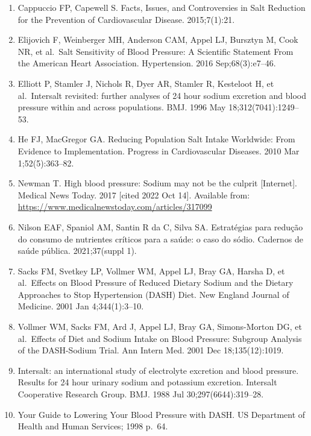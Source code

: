 \documentclass[
]{article}
\providecommand{\tightlist}{%
  \setlength{\itemsep}{0pt}\setlength{\parskip}{0pt}}
\begin{document}
\begin{enumerate}
\def\labelenumi{\arabic{enumi}.}
\tightlist
\item
  Cappuccio FP, Capewell S. Facts, Issues, and Controversies in Salt
  Reduction for the Prevention of Cardiovascular Disease. 2015;7(1):21.
\item
  Elijovich F, Weinberger MH, Anderson CAM, Appel LJ, Bursztyn M, Cook
  NR, et al.~Salt Sensitivity of Blood Pressure: A Scientific Statement
  From the American Heart Association. Hypertension. 2016
  Sep;68(3):e7--46.
\item
  Elliott P, Stamler J, Nichols R, Dyer AR, Stamler R, Kesteloot H, et
  al.~Intersalt revisited: further analyses of 24 hour sodium excretion
  and blood pressure within and across populations. BMJ. 1996 May
  18;312(7041):1249--53.
\item
  He FJ, MacGregor GA. Reducing Population Salt Intake Worldwide: From
  Evidence to Implementation. Progress in Cardiovascular Diseases. 2010
  Mar 1;52(5):363--82.
\item
  Newman T. High blood pressure: Sodium may not be the culprit
  {[}Internet{]}. Medical News Today. 2017 {[}cited 2022 Oct 14{]}.
  Available from: \url{https://www.medicalnewstoday.com/articles/317099}
\item
  Nilson EAF, Spaniol AM, Santin R da C, Silva SA. Estratégias para
  redução do consumo de nutrientes críticos para a saúde: o caso do
  sódio. Cadernos de saúde pública. 2021;37(suppl 1).
\item
  Sacks FM, Svetkey LP, Vollmer WM, Appel LJ, Bray GA, Harsha D, et
  al.~Effects on Blood Pressure of Reduced Dietary Sodium and the
  Dietary Approaches to Stop Hypertension (DASH) Diet. New England
  Journal of Medicine. 2001 Jan 4;344(1):3--10.
\item
  Vollmer WM, Sacks FM, Ard J, Appel LJ, Bray GA, Simons-Morton DG, et
  al.~Effects of Diet and Sodium Intake on Blood Pressure: Subgroup
  Analysis of the DASH-Sodium Trial. Ann Intern Med. 2001 Dec
  18;135(12):1019.
\item
  Intersalt: an international study of electrolyte excretion and blood
  pressure. Results for 24 hour urinary sodium and potassium excretion.
  Intersalt Cooperative Research Group. BMJ. 1988 Jul
  30;297(6644):319--28.
\item
  Your Guide to Lowering Your Blood Pressure with DASH. US Department of
  Health and Human Services; 1998 p.~64.
\end{enumerate}
\end{document}
